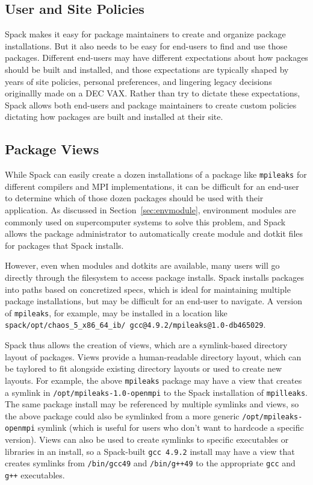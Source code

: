 
\subsection{User and Site Policies}
\label{sec:usecase-policy}

Spack makes it easy for package maintainers to create and organize package installations.
But it also needs to be easy for end-users to find and use those packages.
Different end-users may have different expectations about how packages should be built and installed,
and those expectations are typically shaped by years of site policies, personal preferences,
and lingering legacy decisions originallly made on a DEC VAX.
Rather than try to dictate these expectations,
Spack allows both end-users and package maintainers to create custom policies dictating
how packages are built and installed at their site.

\subsection{Package Views}
\label{sec:package-views}

While Spack can easily create a dozen installations of a package like {\tt mpileaks}
for different compilers and MPI implementations,
it can be difficult for an end-user to determine which of those dozen packages should be used with their application.
As discussed in Section~\ref{sec:envmodule},
environment modules are commonly used on supercomputer systems to solve this problem,
and Spack allows the package administrator to automatically create module and dotkit files for packages that Spack installs.

However, even when modules and dotkits are available,
many users will go directly through the filesystem to access package installs.
Spack installs packages into paths based on concretized specs,
which is ideal for maintaining multiple package installations, but may be difficult for an end-user to navigate.
A version of {\tt mpileaks}, for example, may be installed in a location like
{\tt spack/opt/chaos\_5\_x86\_64\_ib/ gcc@4.9.2/mpileaks@1.0-db465029}.

Spack thus allows the creation of views, which are a symlink-based directory layout of packages.
Views provide a human-readable directory layout,
which can be taylored to fit alongside existing directory layouts or used to create new layouts.
For example, the above {\tt mpileaks} package may have a view that creates a symlink in
{\tt /opt/mpileaks-1.0-openmpi} to the Spack installation of {\tt mpilleaks}.
The same package install may be referenced by multiple symlinks and views,
so the above package could also be symlinked from a more generic {\tt /opt/mpileaks-openmpi}
symlink (which is useful for users who don't want to hardcode a specific version).
Views can also be used to create symlinks to specific executables or libraries in an install,
so a Spack-built {\tt gcc 4.9.2} install may have a view that creates symlinks from
{\tt /bin/gcc49} and {\tt /bin/g++49} to the appropriate {\tt gcc} and {\tt g++} executables.

